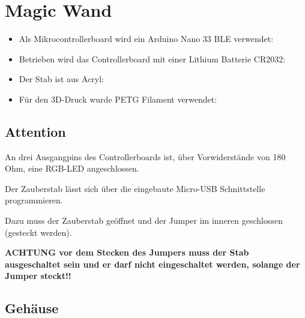 %
%


\chapter{Magic Wand}


\begin{itemize}
  \item Als Mikrocontrollerboard wird ein Arduino Nano 33 BLE verwendet:
    
  \item Betrieben wird das Controllerboard mit einer Lithium Batterie CR2032: \cite{Energizer:2018}
  
        
  \item Der Stab ist aus Acryl: 
  
  \item Für den 3D-Druck wurde PETG Filament verwendet:
  
            
\end{itemize}


\section{Attention}

An drei Ausgangpins des Controllerboards ist, über Vorwiderstände von 180 Ohm, eine RGB-LED
angeschlossen.

Der Zauberstab lässt sich über die eingebaute Micro-USB Schnittstelle programmieren.

Dazu muss der Zauberstab geöffnet und der Jumper im inneren geschlossen (gesteckt werden).


\textbf{ACHTUNG vor dem Stecken des Jumpers muss der Stab ausgeschaltet sein und er darf
nicht eingeschaltet werden, solange der Jumper steckt!!}


\section{Gehäuse}


